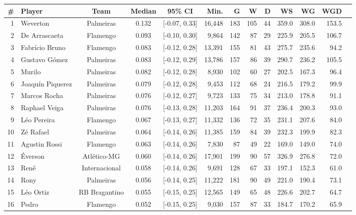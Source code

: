 \begin{table}[htbp]
    \centering
    \tiny
    \begin{tabular}{rlcccrrrrrrrr}
        \toprule
        \# & Player & Team & Median & 95\% CI & Min. & G & W & D & WS & WG & WGD \\
        \midrule
        1 & Weverton & Palmeiras & 0.132 & [-0.07, 0.33] & 16,448 & 183 & 105 & 44 & 359.0 & 308.0 & 153.5 \\
        2 & De Arrascaeta & Flamengo & 0.093 & [-0.10, 0.30] & 9,864 & 142 & 87 & 29 & 225.9 & 205.5 & 106.7 \\
        3 & Fabrício Bruno & Flamengo & 0.083 & [-0.12, 0.28] & 13,391 & 155 & 81 & 43 & 275.7 & 235.6 & 94.2 \\
        4 & Gustavo Gómez & Palmeiras & 0.083 & [-0.12, 0.29] & 13,786 & 157 & 86 & 39 & 290.7 & 236.2 & 105.5 \\
        5 & Murilo & Palmeiras & 0.082 & [-0.12, 0.28] & 8,930 & 102 & 60 & 27 & 202.5 & 167.3 & 96.4 \\
        6 & Joaquín Piquerez & Palmeiras & 0.079 & [-0.12, 0.28] & 9,453 & 112 & 68 & 24 & 216.5 & 179.2 & 99.9 \\
        7 & Marcos Rocha & Palmeiras & 0.076 & [-0.12, 0.27] & 9,723 & 133 & 75 & 34 & 213.0 & 178.8 & 91.1 \\
        8 & Raphael Veiga & Palmeiras & 0.076 & [-0.13, 0.28] & 11,203 & 164 & 91 & 37 & 236.4 & 200.3 & 93.0 \\
        9 & Léo Pereira & Flamengo & 0.067 & [-0.13, 0.27] & 11,332 & 136 & 72 & 35 & 231.1 & 207.6 & 84.0 \\
        10 & Zé Rafael & Palmeiras & 0.064 & [-0.14, 0.26] & 11,385 & 159 & 84 & 39 & 232.3 & 199.9 & 82.3 \\
        11 & Agustin Rossi & Flamengo & 0.063 & [-0.14, 0.26] & 7,830 & 87 & 49 & 22 & 169.0 & 149.0 & 74.0 \\
        12 & Éverson & Atlético-MG & 0.060 & [-0.14, 0.26] & 17,901 & 199 & 90 & 57 & 326.9 & 276.8 & 72.0 \\
        13 & Renê & Internacional & 0.058 & [-0.14, 0.26] & 9,691 & 128 & 67 & 33 & 197.1 & 152.3 & 61.0 \\
        14 & Rony & Palmeiras & 0.056 & [-0.14, 0.25] & 11,222 & 181 & 90 & 49 & 221.0 & 190.4 & 73.1 \\
        15 & Léo Ortiz & RB Bragantino & 0.055 & [-0.15, 0.25] & 12,565 & 149 & 65 & 48 & 226.6 & 202.7 & 64.7 \\
        16 & Pedro & Flamengo & 0.052 & [-0.15, 0.25] & 9,030 & 157 & 87 & 33 & 184.7 & 170.2 & 65.9 \\

\end{tabular}
\end{table}
